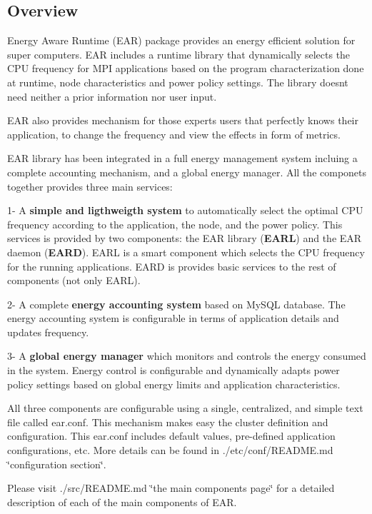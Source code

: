 \subsection*{Overview }

 Energy Aware Runtime (E\+AR) package provides an energy efficient solution for super computers. E\+AR includes a runtime library that dynamically selects the C\+PU frequency for M\+PI applications based on the program characterization done at runtime, node characteristics and power policy settings. The library doesn\textquotesingle{}t need neither a prior information nor user input.

E\+AR also provides mechanism for those experts users that perfectly knows their application, to change the frequency and view the effects in form of metrics.

E\+AR library has been integrated in a full energy management system incluing a complete accounting mechanism, and a global energy manager. All the componets together provides three main services\+:

1-\/ A {\bfseries simple and ligthweigth system} to automatically select the optimal C\+PU frequency according to the application, the node, and the power policy. This services is provided by two components\+: the E\+AR library ({\bfseries E\+A\+RL}) and the E\+AR daemon ({\bfseries E\+A\+RD}). E\+A\+RL is a smart component which selects the C\+PU frequency for the running applications. E\+A\+RD is provides basic services to the rest of components (not only E\+A\+RL).

2-\/ A complete {\bfseries energy accounting system} based on My\+S\+QL database. The energy accounting system is configurable in terms of application details and updates frequency.

3-\/ A {\bfseries global energy manager} which monitors and controls the energy consumed in the system. Energy control is configurable and dynamically adapts power policy settings based on global energy limits and application characteristics.

All three components are configurable using a single, centralized, and simple text file called \textquotesingle{}ear.\+conf\textquotesingle{}. This mechanism makes easy the cluster definition and configuration. This \textquotesingle{}ear.\+conf\textquotesingle{} includes default values, pre-\/defined application configurations, etc. More details can be found in ./etc/conf/\+R\+E\+A\+D\+ME.md \char`\"{}configuration section\char`\"{}.

Please visit ./src/\+R\+E\+A\+D\+ME.md \char`\"{}the main components page\char`\"{} for a detailed description of each of the main components of E\+AR.

